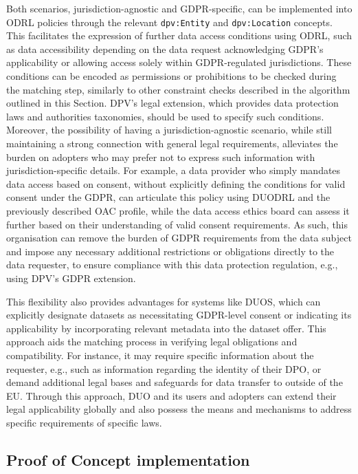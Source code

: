 Both scenarios, jurisdiction-agnostic and GDPR-specific, can be implemented into ODRL policies through the relevant \texttt{dpv:Entity} and \texttt{dpv:Location} concepts.
This facilitates the expression of further data access conditions using ODRL, such as data accessibility depending on the data request acknowledging GDPR's applicability or allowing access solely within GDPR-regulated jurisdictions.
These conditions can be encoded as permissions or prohibitions to be checked during the matching step, similarly to other constraint checks described in the algorithm outlined in this Section.
DPV's legal extension, which provides data protection laws and authorities taxonomies, should be used to specify such conditions.
Moreover, the possibility of having a jurisdiction-agnostic scenario, while still maintaining a strong connection with general legal requirements, alleviates the burden on adopters who may prefer not to express such information with jurisdiction-specific details. 
For example, a data provider who simply mandates data access based on consent, without explicitly defining the conditions for valid consent under the GDPR, can articulate this policy using DUODRL and the previously described OAC profile, while the data access ethics board can assess it further based on their understanding of valid consent requirements.
As such, this organisation can remove the burden of GDPR requirements from the data subject and impose any necessary additional restrictions or obligations directly to the data requester, to ensure compliance with this data protection regulation, e.g., using DPV's GDPR extension.

This flexibility also provides advantages for systems like DUOS, which can explicitly designate datasets as necessitating GDPR-level consent or indicating its applicability by incorporating relevant metadata into the dataset offer.
This approach aids the matching process in verifying legal obligations and compatibility.
For instance, it may require specific information about the requester, e.g., such as information regarding the identity of their DPO, or demand additional legal bases and safeguards for data transfer to outside of the EU.
Through this approach, DUO and its users and adopters can extend their legal applicability globally and also possess the means and mechanisms to address specific requirements of specific laws. 

\subsection{Proof of Concept implementation}
\label{sec:poc_implementation}

